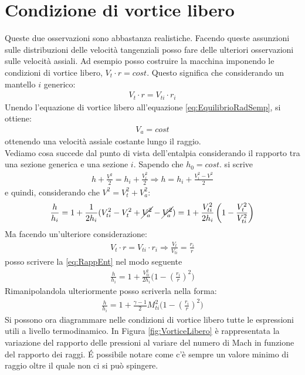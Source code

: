 \section{Condizione di vortice libero}
Queste due osservazioni sono abbastanza realistiche. 
Facendo queste assunzioni sulle distribuzioni delle velocità tangenziali posso fare delle ulteriori osservazioni sulle velocità assiali. 
Ad esempio posso costruire la macchina imponendo le condizioni di vortice libero, $V_t \cdot r = cost$.
Questo significa che considerando un mantello $i$ generico:
\begin{align*}
V_t \cdot r = V_{ti} \cdot r_i
\end{align*}
Unendo l'equazione di vortice libero all'equazione \ref{eq:EquilibrioRadSemp}, si ottiene:
\begin{align*}
V_a=cost
\end{align*}
ottenendo una velocità assiale costante lungo il raggio.\\
Vediamo cosa succede dal punto di vista dell'entalpia considerando il rapporto tra una sezione generica e una sezione $i$. Sapendo che $h_0 = cost.$ si scrive
\begin{align*}
h + \frac{V^2}{2} = h_i + \frac{V_i^2}{2} \Rightarrow h = h_i	+ \frac{V_i^2 - V^2}{2}
\end{align*}
e quindi, considerando che $V^2=V_t^2+V_a^2$:
\begin{equation}
\frac{h}{h_i} = 1 + \frac{1}{2h_i} (V_{ti}^2-V_t^2 + \cancel{V_a^2} -\cancel{V_a^2}) = 1 + \frac{V_{ti}^2}{2h_i} \left( 1- \frac{V_t^2}{V_{ti}^2} \right)
\label{eq:RappEnt}
\end{equation}
Ma facendo un'ulteriore considerazione:
\begin{align*}
V_t \cdot r = V_{ti} \cdot r_i \Rightarrow \frac{V_t}{V_{ti}} = \frac{r_i}{r}
\end{align*}
posso scrivere la \ref{eq:RappEnt} nel modo seguente
\begin{align*}
\boxed{ \frac{h}{h_i} = 1 + \frac{V_{ti}^2}{2h_i} \bigg(1 -  \left( \frac{r_i}{r}\right)^2 \bigg)}
\end{align*}
Rimanipolandola ulteriormente posso scriverla nella forma:
\begin{align*}
\frac{h}{h_i} = 1 + \frac{\gamma -1}{2} M_{ti}^2 \bigg(1 -  \left( \frac{r_i}{r}\right)^2 \bigg) 
\end{align*}
Si possono ora diagrammare nelle condizioni di vortice libero tutte le espressioni utili a livello termodinamico. In Figura \ref{fig:VorticeLibero} è rappresentata la variazione del rapporto delle pressioni al variare del numero di Mach in funzione del rapporto dei raggi. \'E possibile notare come c'è sempre un valore minimo di raggio oltre il quale non ci si può spingere.
